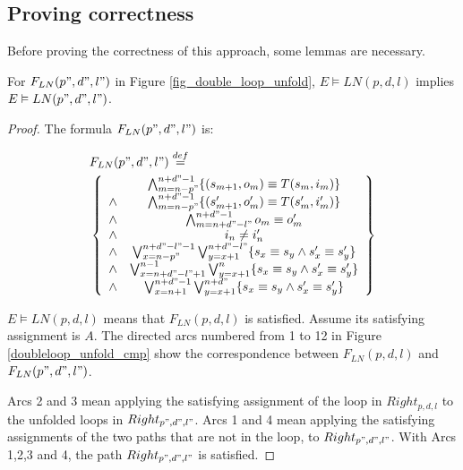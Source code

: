\documentclass[journal]{IEEEtran}
\begin{document}
\subsection{Proving correctness}

Before proving the correctness of this approach,
some lemmas are necessary.


\begin{lemma}[]\label{lemma_unfold_longer}
For $F_{LN}(p",d",l")$ in Figure \ref{fig_double_loop_unfold},
$E\vDash LN(p,d,l)$ implies $E\vDash LN(p",d",l")$.
\end{lemma}
\begin{proof}
The formula $F_{LN}(p",d",l")$ is:

\begin{equation}\label{equ_correspondance}
\begin{split}
&F_{LN}(p",d",l")\stackrel{def}{=}\\
&\left\{
\begin{array}{cc}
&\bigwedge_{m=n-p"}^{n+d"-1}
\{
(s_{m+1},o_m)\equiv T(s_m,i_m)
\}
\\
\wedge&\bigwedge_{m=n-p"}^{n+d"-1}
\{
(s'_{m+1},o'_m)\equiv T(s'_m,i'_m)
\}
\\
\wedge&\bigwedge_{m=n+d"-l"}^{n+d"-1}o_m\equiv o'_m \\
\wedge& i_n\ne i'_n \\
\wedge& \bigvee_{x=n-p"}^{n+d"-l"-1}\bigvee_{y=x+1}^{n+d"-l"} \{s_x\equiv s_y\wedge s'_x\equiv s'_y\} \\
\wedge& \bigvee_{x=n+d"-l"+1}^{n-1}\bigvee_{y=x+1}^{n} \{s_x\equiv s_y\wedge s'_x\equiv s'_y\} \\
\wedge& \bigvee_{x=n+1}^{n+d"-1}\bigvee_{y=x+1}^{n+d"} \{s_x\equiv s_y\wedge s'_x\equiv s'_y\}
\end{array}
\right\}
\end{split}
\end{equation}

$E\vDash LN(p,d,l)$ means that $F_{LN}(p,d,l)$ is satisfied.
Assume its satisfying assignment is $A$.
The directed arcs numbered from 1 to 12 in Figure \ref{doubleloop_unfold_cmp}
show the correspondence between $F_{LN}(p,d,l)$ and $F_{LN}(p",d",l")$.

Arcs 2 and 3 mean applying the satisfying assignment of the loop in $Right_{p,d,l}$
to the unfolded loops in $Right_{p",d",l"}$.
Arcs 1 and 4 mean applying the satisfying assignments of the two paths that are not in the loop,
to $Right_{p",d",l"}$.
With Arcs 1,2,3 and 4,
the path $Right_{p",d",l"}$ is satisfied.


\end{proof}
\end{document}
